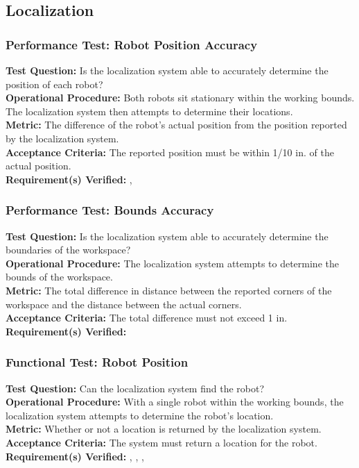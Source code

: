 
\subsection{Localization}
\label{sec:verification_localization}

\subsubsection{Performance Test: Robot Position Accuracy}
\label{test:localization_pt_accuracy}
\textbf{Test Question:} Is the localization system able to accurately determine the position of each robot?\\
\textbf{Operational Procedure:} Both robots sit stationary within the working bounds. The localization system then attempts to determine their locations.\\
\textbf{Metric:} The difference of the robot's actual position from the position reported by the localization system. \\
\textbf{Acceptance Criteria:} The reported position must be within 1/10 in. of the actual position.\\
\textbf{Requirement(s) Verified:} , 

\subsubsection{Performance Test: Bounds Accuracy}
\label{test:localization_pt_bounds}
\textbf{Test Question:} Is the localization system able to accurately determine the boundaries of the workspace?\\
\textbf{Operational Procedure:} The localization system attempts to determine the bounds of the workspace.\\
\textbf{Metric:} The total difference in distance between the reported corners of the workspace and the distance between the actual corners.\\
\textbf{Acceptance Criteria:} The total difference must not exceed 1 in.\\
\textbf{Requirement(s) Verified:} 

\subsubsection{Functional Test: Robot Position}
\label{test:localization_ft_robopos}
\textbf{Test Question:} Can the localization system find the robot?\\
\textbf{Operational Procedure:} With a single robot within the working bounds, the localization system attempts to determine the robot's location.\\
\textbf{Metric:} Whether or not a location is returned by the localization system.\\
\textbf{Acceptance Criteria:} The system must return a location for the robot. \\
\textbf{Requirement(s) Verified:} , , , 

